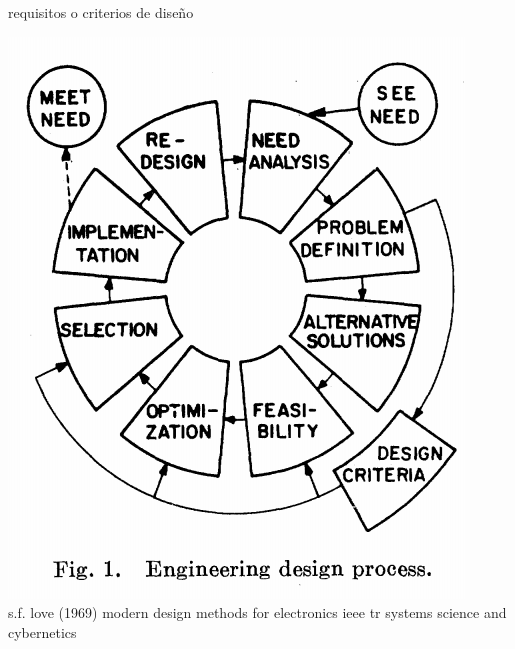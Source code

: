 \documentclass[presentation,aspectratio=169]{beamer}
\begin{document}
\begin{frame}[label={sec:org4d94549}]{requisitos o criterios de diseño}
 \begin{center}
\includegraphics[height=0.6\textheight]{../../figures/design-process-fig1.png}\\
{\footnotesize  s.f. love (1969) modern design methods for electronics ieee tr systems science and cybernetics}
\end{center}
\end{frame}
\end{document}
